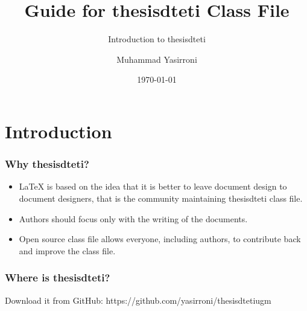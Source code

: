 \documentclass{beamer}
\title{Guide for thesisdteti Class File}
\subtitle{Introduction to thesisdteti}
\author{Muhammad Yasirroni}
\institute{Universitas Gadjah Mada}
\date{\today}
\begin{document}
\begin{frame}
  \titlepage
\end{frame}

\section{Introduction}
\begin{frame}
    \frametitle{Why thesisdteti?}
    \begin{itemize}
      \item LaTeX is based on the idea that it is better to leave document design to document designers, that is the community maintaining thesisdteti class file.
      \item Authors should focus only with the writing of the documents.
      \item Open source class file allows everyone, including authors, to contribute back and improve the class file.
    \end{itemize}
\end{frame}

\begin{frame}
  \frametitle{Where is thesisdteti?}
  Download it from GitHub: https://github.com/yasirroni/thesisdtetiugm
\end{frame}
\end{document}

